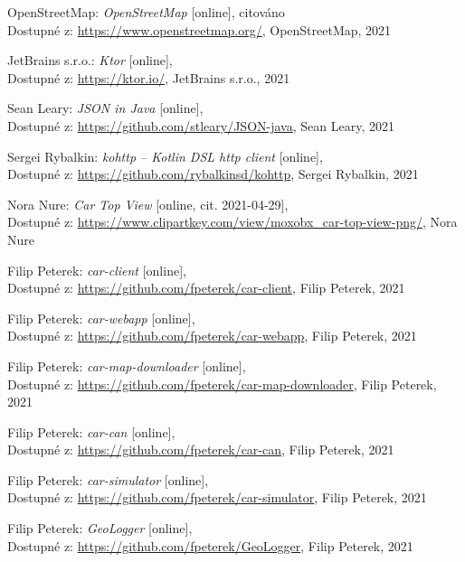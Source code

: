 \documentclass[czech, bachelor]{diploma}
\begin{document}
\begin{thebibliography}{50}
OpenStreetMap: \textit{OpenStreetMap} [online], citováno \\
Dostupné z:
\url{https://www.openstreetmap.org/},
OpenStreetMap, 2021

JetBrains s.r.o.: \textit{Ktor} [online], \\
Dostupné z:
\url{https://ktor.io/},
JetBrains s.r.o., 2021

Sean Leary: \textit{JSON in Java} [online], \\
Dostupné z:
\url{https://github.com/stleary/JSON-java},
Sean Leary, 2021

Sergei Rybalkin: \textit{kohttp -- Kotlin DSL http client} [online], \\
Dostupné z:
\url{https://github.com/rybalkinsd/kohttp},
Sergei Rybalkin, 2021

Nora Nure: \textit{Car Top View} [online, cit. 2021-04-29], \\
Dostupné z:
\url{https://www.clipartkey.com/view/moxobx\_car-top-view-png/},
Nora Nure

Filip Peterek: \textit{car-client} [online], \\
Dostupné z:
\url{https://github.com/fpeterek/car-client},
Filip Peterek, 2021

Filip Peterek: \textit{car-webapp} [online], \\
Dostupné z:
\url{https://github.com/fpeterek/car-webapp},
Filip Peterek, 2021

Filip Peterek: \textit{car-map-downloader} [online], \\
Dostupné z:
\url{https://github.com/fpeterek/car-map-downloader},
Filip Peterek, 2021

Filip Peterek: \textit{car-can} [online], \\
Dostupné z:
\url{https://github.com/fpeterek/car-can},
Filip Peterek, 2021

Filip Peterek: \textit{car-simulator} [online], \\
Dostupné z:
\url{https://github.com/fpeterek/car-simulator},
Filip Peterek, 2021

Filip Peterek: \textit{GeoLogger} [online], \\
Dostupné z:
\url{https://github.com/fpeterek/GeoLogger},
Filip Peterek, 2021

\end{thebibliography}
\end{document}
